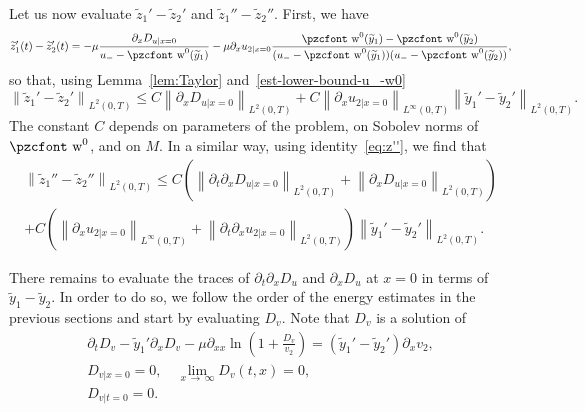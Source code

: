 \documentclass[10pt]{amsart}
\theoremstyle{definition}\newtheorem{defi}[theo]{Definition}\newtheorem{rema}[theo]{Remark}\newtheorem{exam}[theo]{Example}\newtheorem{exem}[theo]{Example}\newtheorem{nota}[theo]{Notation}
\newcommand{\mathpzc}[1]{\text{\pzcfont #1}}
\newcommand{\p}{\partial}
\newcommand{\tw}{\mathpzc{w}}
\newcommand{\ty}{\widetilde{y}}
\newcommand{\tz}{\widetilde{z}}
\newcommand{\dv}{D_v}
\newcommand{\du}{D_u}
\begin{document}
Let us now evaluate $\tz_1'-\tz_2'$ and $\tz_1''-\tz_2''$. First, we have
\[
\tz_1'(t)-\tz_2'(t)=-\mu \frac{\p_x D_{u|x=0}}{u_--\tw^0(\ty_1)} - \mu \p_x u_{2|x=0}\frac{\tw^0(\ty_1)-\tw^0(\ty_2)}{(u_--\tw^0(\ty_1))(u_--\tw^0(\ty_2)) },
\]
so that, using Lemma~\ref{lem:Taylor} and~\eqref{est-lower-bound-u_-w0}
\begin{equation}\label{est:tz'}
\left\|\tz_1'-\tz_2'\right\|_{L^2(0,T)}\leq C \left\| \p_x D_{u|x=0}\right\|_{L^2(0,T)} + C \left\|\p_x u_{2|x=0}\right\|_{L^\infty(0,T)}\left\|\ty_1'-\ty_2'\right\|_{L^2(0,T)}.
\end{equation} The constant $C$ depends on parameters of the problem, on Sobolev norms of $\tw^0$, and on $M$. In a similar way, using identity~\eqref{eq:z''}, we find that
\begin{multline}\label{est:tz''}
\left\|\tz_1''-\tz_2''\right\|_{L^2(0,T)} \leq C \left(\left\|\p_t \p_x D_{u|x=0}\right\|_{L^2(0,T)} + \left\| \p_x D_{u|x=0}\right\|_{L^2(0,T)}\right)\\
+ C \left(\left\|\p_x u_{2|x=0}\right\|_{L^\infty(0,T)} + \left\|\p_t\p_x u_{2|x=0}\right\|_{L^2(0,T)} \right)\left\|\ty_1'-\ty_2'\right\|_{L^2(0,T)}.
\end{multline}


There remains to evaluate the traces of $\p_t\p_x \du$ and $\p_x \du$ at $x=0$ in terms of $\ty_1-\ty_2$. In order to do so, we follow the order of the energy estimates in the previous sections and start by evaluating $\dv$. Note that $\dv$ is a solution of
\begin{align*}
\p_t \dv - \ty_1'\p_x \dv - \mu \p_{xx}\ln \left(1+ \frac{\dv}{v_2}\right)= \left(\ty_1'-\ty_2'\right)\p_x v_2,\\
D_{v|x=0}=0,\quad \lim_{x\,\to\,\infty}\dv(t,x)=0,\\
D_{v|t=0}=0.
\end{align*}
\end{document}

